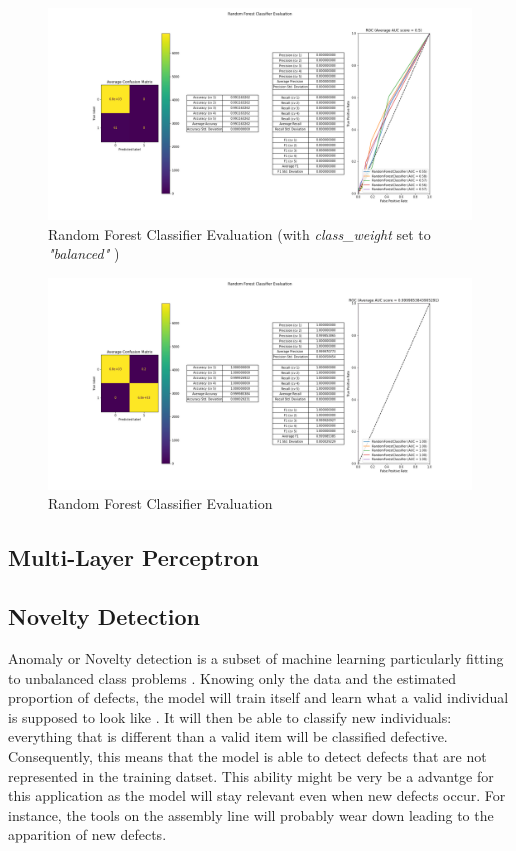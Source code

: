 \begin{figure}
    \center
    \includegraphics[scale=0.32]{img/rfc_w.png}
    \caption{Random Forest Classifier Evaluation (with \textit{class\_weight} set to \textit{"balanced"} )}
    \label{rfc_w}
\end{figure}

\begin{figure}
    \center
    \includegraphics[scale=0.32]{img/rfc_d.png}
    \caption{Random Forest Classifier Evaluation}
    \label{rfc}
\end{figure}

\subsection{Multi-Layer Perceptron}

\subsection{Novelty Detection}
Anomaly or Novelty detection is a subset of machine learning particularly fitting to unbalanced class problems \cite{novel_scikit}. Knowing only the data and the estimated proportion of defects, the model will train itself and learn what a valid individual is supposed to look like \cite{novel_yt}. It will then be able to classify new individuals: everything that is different than a valid item will be classified defective. Consequently, this means that the model is able to detect defects that are not represented in the training datset. This ability might be very be a advantge for this application as the model will stay relevant even when new defects occur. For instance, the tools on the assembly line will probably wear down leading to the apparition of new defects.